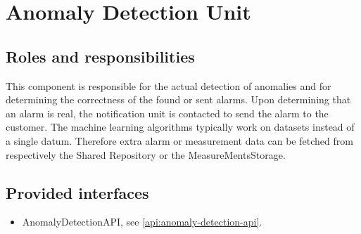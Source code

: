 \section{Anomaly Detection Unit}
\label{element:anomaly-detection-unit}

\subsection{Roles and responsibilities}

\npar This component is responsible for the actual detection of anomalies and
for determining the correctness of the found or sent alarms. Upon determining
that an alarm is real, the notification unit is contacted to send the alarm to
the customer. The machine learning algorithms typically work on datasets instead
of a single datum. Therefore extra alarm or measurement data can be fetched from
respectively the Shared Repository or the MeasureMentsStorage.

\subsection{Provided interfaces}

\begin{itemize}
  \item AnomalyDetectionAPI, see \ref{api:anomaly-detection-api}.
\end{itemize}



